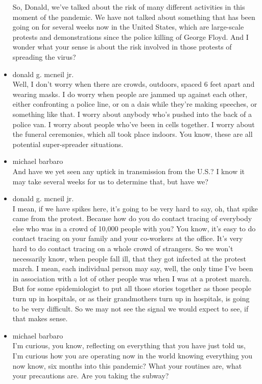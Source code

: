 \begin{itemize}
  So, Donald, we've talked about the risk of many different activities
  in this moment of the pandemic. We have not talked about something
  that has been going on for several weeks now in the United States,
  which are large-scale protests and demonstrations since the police
  killing of George Floyd. And I wonder what your sense is about the
  risk involved in those protests of spreading the virus?
\item
  donald g. mcneil jr.\\
  Well, I don't worry when there are crowds, outdoors, spaced 6 feet
  apart and wearing masks. I do worry when people are jammed up against
  each other, either confronting a police line, or on a dais while
  they're making speeches, or something like that. I worry about anybody
  who's pushed into the back of a police van. I worry about people
  who've been in cells together. I worry about the funeral ceremonies,
  which all took place indoors. You know, these are all potential
  super-spreader situations.
\item
  michael barbaro\\
  And have we yet seen any uptick in transmission from the U.S.? I know
  it may take several weeks for us to determine that, but have we?
\item
  donald g. mcneil jr.\\
  I mean, if we have spikes here, it's going to be very hard to say, oh,
  that spike came from the protest. Because how do you do contact
  tracing of everybody else who was in a crowd of 10,000 people with
  you? You know, it's easy to do contact tracing on your family and your
  co-workers at the office. It's very hard to do contact tracing on a
  whole crowd of strangers. So we won't necessarily know, when people
  fall ill, that they got infected at the protest march. I mean, each
  individual person may say, well, the only time I've been in
  association with a lot of other people was when I was at a protest
  march. But for some epidemiologist to put all those stories together
  as those people turn up in hospitals, or as their grandmothers turn up
  in hospitals, is going to be very difficult. So we may not see the
  signal we would expect to see, if that makes sense.
\item
  michael barbaro\\
  I'm curious, you know, reflecting on everything that you have just
  told us, I'm curious how you are operating now in the world knowing
  everything you now know, six months into this pandemic? What your
  routines are, what your precautions are. Are you taking the subway?

\end{itemize}
